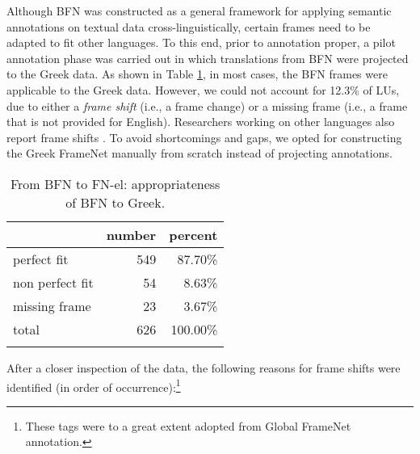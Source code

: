 \documentclass[output=paper,colorlinks,citecolor=brown]{langscibook}
\begin{document}
Although BFN was constructed as a general framework for applying semantic annotations on textual data cross-linguistically, certain frames need to be adapted to fit other languages. To this end, prior to annotation proper, a pilot annotation phase was carried out \citep{giouli_etal_2020} in which translations from BFN were projected to the Greek data. As shown in Table \ref{tab:BFN-to-FN-el}, in most cases, the BFN frames were applicable to the Greek data. However, we could not account for 12.3\% of LUs, due to either a \textit{frame shift} (i.e., a frame change) or a missing frame (i.e., a frame that is not provided for English). Researchers working on other languages also report frame shifts \citep{yong-etal-2022-frame}. To avoid shortcomings and gaps, we opted for constructing the Greek FrameNet manually from scratch instead of projecting annotations.

\begin{table}
\caption{From BFN to FN-el: appropriateness of BFN to Greek.}
\label{tab:BFN-to-FN-el}
 \begin{tabular}{l rr}
  \lsptoprule
            & number  & percent \\
  \midrule
  perfect fit  &   549  &    87.70\%  \\
  non perfect fit  &   54 &   8.63\%   \\
  missing frame  &   23 &   3.67\%  \\
 total  & 626   &	100.00\% \\
  \lspbottomrule
 \end{tabular}
\end{table}

After a closer inspection of the data, the following reasons for frame shifts were identified (in order of occurrence):\footnote{These tags were to a great extent adopted from Global FrameNet annotation.}
\end{document}
